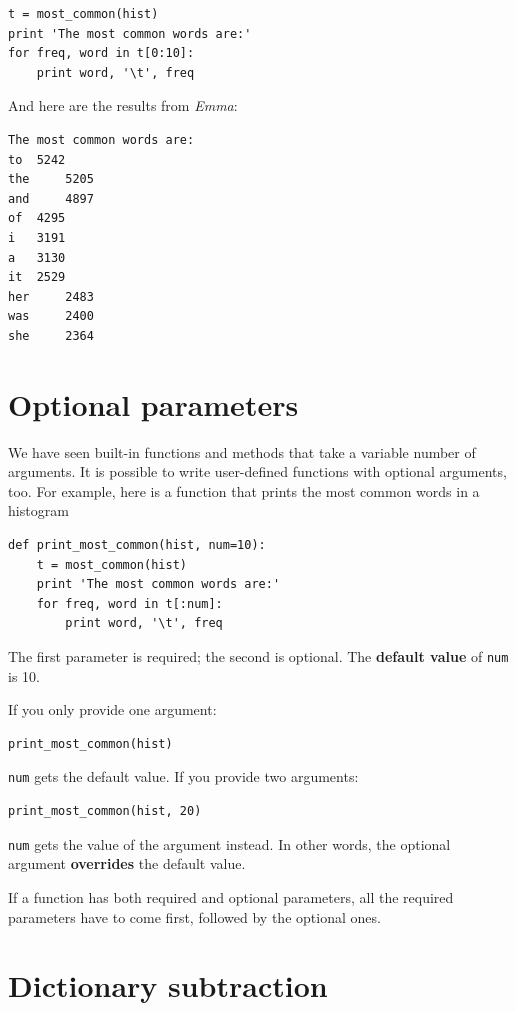 \documentclass[10pt]{book}
\begin{document}
\begin{verbatim}
t = most_common(hist)
print 'The most common words are:'
for freq, word in t[0:10]:
    print word, '\t', freq
\end{verbatim}
%
And here are the results from {\em Emma}:

\begin{verbatim}
The most common words are:
to 	5242
the 	5205
and 	4897
of 	4295
i 	3191
a 	3130
it 	2529
her 	2483
was 	2400
she 	2364
\end{verbatim}
%

\section{Optional parameters}

We have seen built-in functions and methods that take a variable
number of arguments.  It is possible to write user-defined functions
with optional arguments, too.  For example, here is a function that
prints the most common words in a histogram

\begin{verbatim}
def print_most_common(hist, num=10):
    t = most_common(hist)
    print 'The most common words are:'
    for freq, word in t[:num]:
        print word, '\t', freq
\end{verbatim}

The first parameter is required; the second is optional.
The {\bf default value} of {\tt num} is 10.

If you only provide one argument:

\begin{verbatim}
print_most_common(hist)
\end{verbatim}

{\tt num} gets the default value.  If you provide two arguments:

\begin{verbatim}
print_most_common(hist, 20)
\end{verbatim}

{\tt num} gets the value of the argument instead.  In other
words, the optional argument {\bf overrides} the default value.

If a function has both required and optional parameters, all
the required parameters have to come first, followed by the
optional ones.


\section{Dictionary subtraction}
\end{document}
